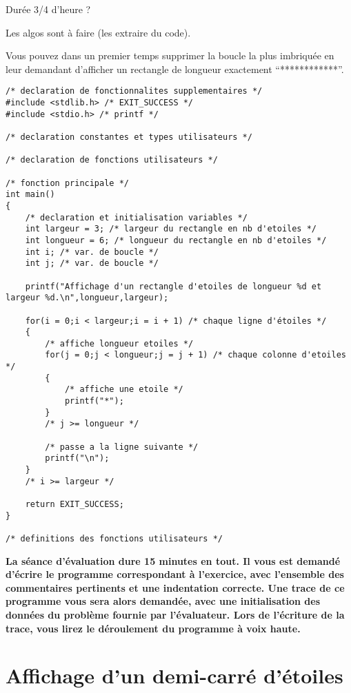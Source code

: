 \begin{correction}
Durée 3/4 d'heure ?

Les algos sont à faire (les extraire du code).

Vous pouvez dans un premier temps supprimer la boucle la plus imbriquée en leur demandant d'afficher un rectangle de longueur exactement ``************''.

\begin{verbatim}
/* declaration de fonctionnalites supplementaires */
#include <stdlib.h> /* EXIT_SUCCESS */
#include <stdio.h> /* printf */

/* declaration constantes et types utilisateurs */

/* declaration de fonctions utilisateurs */

/* fonction principale */
int main()
{
    /* declaration et initialisation variables */
    int largeur = 3; /* largeur du rectangle en nb d'etoiles */
    int longueur = 6; /* longueur du rectangle en nb d'etoiles */
    int i; /* var. de boucle */
    int j; /* var. de boucle */

    printf("Affichage d'un rectangle d'etoiles de longueur %d et largeur %d.\n",longueur,largeur);

    for(i = 0;i < largeur;i = i + 1) /* chaque ligne d'étoiles */
    {
        /* affiche longueur etoiles */
        for(j = 0;j < longueur;j = j + 1) /* chaque colonne d'etoiles */
        {
            /* affiche une etoile */
            printf("*");
        }
        /* j >= longueur */

        /* passe a la ligne suivante */
        printf("\n");
    }
    /* i >= largeur */

    return EXIT_SUCCESS;
}

/* definitions des fonctions utilisateurs */
\end{verbatim}
\end{correction}

\newpage
\textbf{La séance d'évaluation dure 15 minutes en tout. Il vous est demandé d'écrire le programme correspondant à l'exercice, avec l'ensemble des commentaires pertinents et une indentation correcte. Une trace de ce programme vous sera alors demandée, avec une initialisation des données du problème fournie par l'évaluateur. Lors de l'écriture de la trace, vous lirez le déroulement du programme à voix haute.}

\section{Affichage d'un demi-carré d'étoiles}

